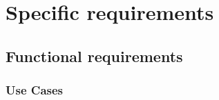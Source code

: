 \chapter{Specific requirements}

\newcommand{\funcRequirement}[6]{
\begin{center}
\begin{tabular}{|l|p{12cm}|}
\hline
Req. ID 		& #1 \\ \hline
Name 				& #2 \\ \hline
Description & #3 \\ \hline
Priority 		& #4 \\ \hline
Comment 		& #5 \\ \hline
\end{tabular}
\end{center}
}

\newcommand{\nonFuncRequirement}[6]{
\begin{center}
\begin{tabular}{|l|p{12cm}|}
\hline
Req. ID 		 & #1 \\ \hline
Name 				 & #2 \\ \hline
Beschreibung & #3 \\ \hline
Typ 				 & #4 \\ \hline
Priorität 	 & #5 \\ \hline
Anmerkung    & #6\\ \hline
\end{tabular}
\end{center}
}


	\section{Functional requirements}

	\subsection{Use Cases}
	
